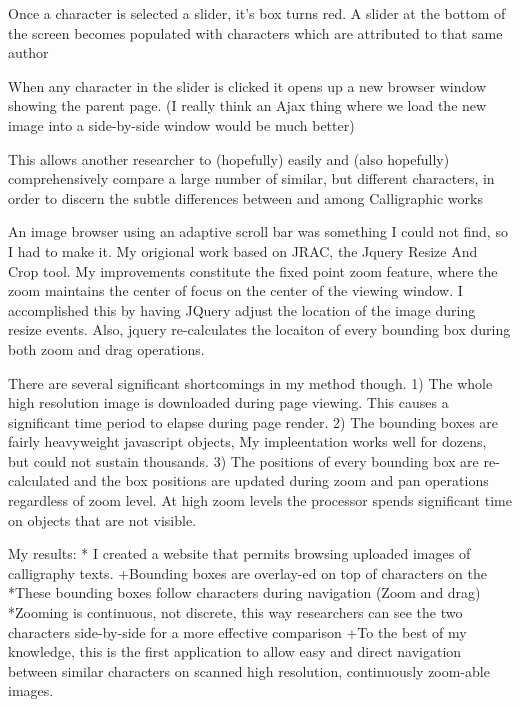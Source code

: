                 Once a character is selected a slider, it's box turns red. A slider at the bottom of the screen becomes populated with characters which are attributed to that same author
                
                When any character in the slider is clicked it opens up a new browser window showing the parent page.  (I really think an Ajax thing where we load the new image into a side-by-side window would be much better)
                
                This allows another researcher to (hopefully) easily and (also hopefully) comprehensively compare a large number of similar, but different characters, in order to discern the subtle differences between and among Calligraphic works
                
                An image browser using an adaptive scroll bar was something I could not find, so I had to make it.  My origional work based on JRAC, the Jquery Resize And Crop tool.  My improvements constitute the fixed point zoom feature, where the zoom maintains the center of focus on the center of the viewing window.  I accomplished this by having JQuery adjust the location of the image during resize events.  Also, jquery re-calculates the locaiton of every bounding box during both zoom and drag operations.
                
                There are several significant shortcomings in my method though.
                1)  The whole high resolution image is downloaded during page viewing. This causes a significant time period to elapse during page render.
                2)  The bounding boxes are fairly heavyweight javascript objects, My impleentation works well for dozens, but could not sustain thousands.
                3)  The positions of every bounding box are re-calculated and the box positions are updated during zoom and pan operations regardless of zoom level.  At high zoom levels the processor spends significant time on objects that are not visible.
                
                
                    My results:
        *  I created a website that permits browsing uploaded images of calligraphy texts.
            +Bounding boxes are overlay-ed on top of characters on the 
                *These bounding boxes follow characters during navigation (Zoom and drag)
                *Zooming is continuous, not discrete, this way researchers can see the two characters side-by-side for a more effective comparison
            +To the best of my knowledge, this is the first application to allow easy and direct navigation between similar characters on scanned high resolution, continuously zoom-able images.
            

